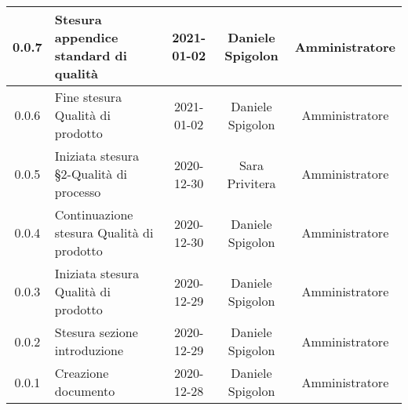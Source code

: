 \begin{center}
\begin{longtable}{|c|p{5cm}|c|c|c|}
	\hline
	0.0.7 & Stesura appendice standard di qualità & 2021-01-02 & Daniele Spigolon & Amministratore \\
	\hline
	0.0.6 & Fine stesura Qualità di prodotto & 2021-01-02 & Daniele Spigolon & Amministratore \\
	\hline
	0.0.5 & Iniziata stesura §2-Qualità di processo & 2020-12-30 & Sara Privitera & Amministratore \\
	\hline
	0.0.4 & Continuazione stesura Qualità di prodotto & 2020-12-30 & Daniele Spigolon & Amministratore \\
	\hline
	0.0.3 & Iniziata stesura Qualità di prodotto & 2020-12-29 & Daniele Spigolon & Amministratore \\
	\hline
	0.0.2 & Stesura sezione introduzione & 2020-12-29 & Daniele Spigolon & Amministratore \\
	\hline
	0.0.1 & Creazione documento & 2020-12-28 & Daniele Spigolon & Amministratore \\
	\hline

	\end{longtable}
\end{center}